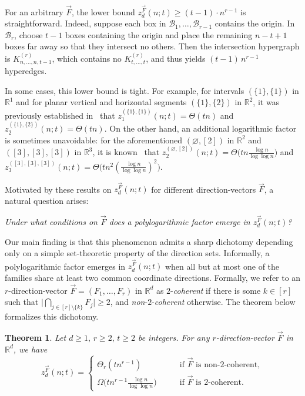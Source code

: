 \documentclass[11pt]{article}
\newtheorem{theorem}{Theorem}[section]
\theoremstyle{definition}
\newcommand*{\R}{\mathbb{R}}                                    %
\newcommand*{\vF}{\vec{F}}
\newcommand*{\cB}{\mathcal{B}}
\begin{document}
For an arbitrary $\vF$, the lower bound $z_d^{\vF}(n; t) \ge (t-1) \cdot n^{r-1}$ is straightforward. Indeed, suppose each box in $\cB_1, \dots, \cB_{r-1}$ contains the origin. In $\cB_r$, choose $t-1$ boxes containing the origin and place the remaining $n - t + 1$ boxes far away so that they intersect no others. Then the intersection hypergraph is $K_{n, \dots, n, t-1}^{(r)}$, which contains no $K_{t, \dots, t}^{(r)}$, and thus yields $(t-1)\, n^{r-1}$ hyperedges. 

In some cases, this lower bound is tight. For example, for intervals $(\{1\}, \{1\})$ in $\R^1$ and for planar vertical and horizontal segments $(\{1\}, \{2\})$ in $\R^2$, it was previously established in~\cite{chan_har-peled,keller_smorodinsky} that
$z_1^{(\{1\}, \{1\})}(n; t) = \Theta(tn)$ and $z_2^{(\{1\}, \{2\})}(n; t) = \Theta(tn)$. On the other hand, an additional logarithmic factor is sometimes unavoidable: for the aforementioned $(\varnothing, [2])$ in $\R^2$ and $([3], [3], [3])$ in $\R^3$, it is known~\cite{chan_har-peled,chan_keller_smorodinsky} that
$z_2^{(\varnothing, [2])}(n; t) = \Theta \bigl( tn \tfrac{\log n}{\log\log n} \bigr)$ and
$z_3^{([3], [3], [3])}(n; t) = \Theta \bigl( tn^2 (\tfrac{\log n}{\log\log n})^2 \bigr)$. 

\smallskip

Motivated by these results on $z_d^{\vF}(n; t)$ for different direction-vectors $\vF$, a natural question arises:
\begin{center}
    \emph{Under what conditions on $\vF$ does a polylogarithmic factor emerge in $z_d^{\vF}(n; t)$?}
\end{center}
Our main finding is that this phenomenon admits a sharp dichotomy depending only on a simple set-theoretic property of the direction sets. Informally, a polylogarithmic factor emerges in $z_d^{\vF}(n; t)$ when all but at most one of the families share at least two common coordinate directions. Formally, we refer to an $r$-direction-vector $\vF = (F_1, \dots, F_r)$ in $\R^d$ as $2$-\emph{coherent} if there is some $k \in [r]$ such that $\bigl| \bigcap_{j \in [r] \setminus \{k\}} F_j \bigr| \ge 2$, and \emph{non}-$2$-\emph{coherent} otherwise. The theorem below formalizes this dichotomy. 

\begin{theorem} \label{thm:main}
    Let $d \ge 1, \, r \ge 2, \, t \ge 2$ be integers. For any $r$-direction-vector $\vF$ in $\R^d$, we have
    \[
    z_d^{\vF} (n; t) = 
    \begin{cases}
        \Theta_r (t n^{r-1}) &\text{if $\vF$ is non-$2$-coherent}, \\
        \Omega \bigl( t n^{r-1} \frac{\log n}{\log\log n} \bigr) \qquad &\text{if $\vF$ is $2$-coherent}. 
    \end{cases}
\]
\end{theorem}
\end{document}

